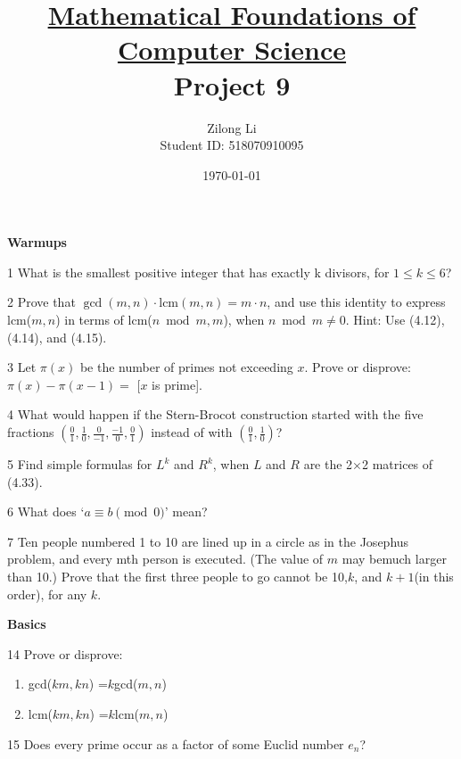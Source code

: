 \documentclass[a4paper,12pt]{article}
\title{\small \underline{Mathematical Foundations of Computer Science}\\\Large Project 9}
\author{Zilong Li\\\small Student ID: 518070910095}
\date{\today}
\theoremstyle{definition}
\newenvironment{problems}{\begin{list}{}{\renewcommand{\makelabel}[1]{\textbf{##1}\hfil}}}{\end{list}}
\begin{document}
\maketitle

\noindent\textbf{Warmups}

\begin{problems}
    \item[1] What  is  the  smallest  positive  integer  that  has  exactly k divisors,  for $1\leq k\leq 6$?
    \item[2] Prove that $\gcd (m, n)\cdot\text{lcm} (m, n)=m\cdot n$, and use this identity to express lcm($m, n$) in terms of lcm($n\bmod m, m$), when $n \bmod m\neq 0$. Hint: Use (4.12), (4.14), and (4.15).
    \item[3] Let $\pi(x)$ be the number of primes not exceeding $x$.  Prove or disprove: $\pi(x) -\pi(x-1) =$ [$x$ is prime].
    \item[4] What would happen if the Stern-Brocot construction started with the five fractions $\left(\frac{0}{1},\frac{1}{0},\frac{0}{-1},\frac{-1}{0},\frac{0}{1}\right)$ instead of with $\left(\frac{0}{1},\frac{1}{0}\right)$?
    \item[5] Find simple formulas for $L^k$ and $R^k$, when $L$ and $R$ are the 2$\times$2 matrices of (4.33).
    \item[6] What does `$a \equiv b\pmod 0$' mean?
    \item[7] Ten people numbered 1 to 10 are lined up in a circle as in the Josephus problem,  and every mth person is executed.  (The value of $m$ may bemuch larger than 10.)  Prove that the first three people to go cannot be 10,$k$, and $k+1$(in this order), for any $k$.
\end{problems}

\noindent\textbf{Basics}

\begin{problems}
    \item[14] Prove or disprove:
    \begin{enumerate}[a]
        \item gcd($km, kn$) =$k$gcd($m, n$)
        \item lcm($km, kn$) =$k$lcm($m, n$)
    \end{enumerate} 
    \item[15] Does every prime occur as a factor of some Euclid number $e_n$?
\end{problems}
\end{document}
